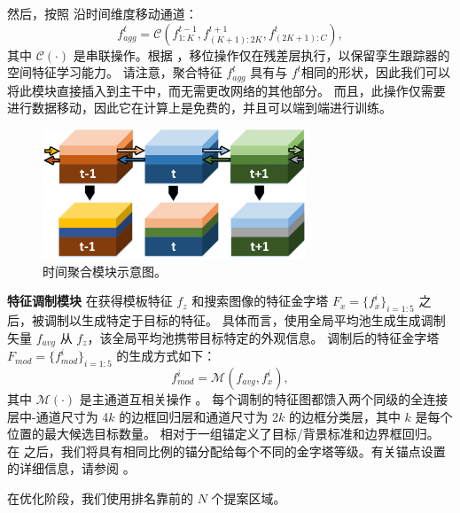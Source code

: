 然后，按照 \cite{lin2019tsm} 沿时间维度移动通道：
\begin{equation}
    f_{agg}^t = \mathcal{C}(f_{{1:K}}^{t-1}, f_{(K+1):2K}^{t+1}, f_{(2K+1):C}^{t}),
\end{equation}
其中 $\mathcal{C}(\cdot)$ 是串联操作。根据 \cite{lin2019tsm}，移位操作仅在残差层执行，以保留孪生跟踪器的空间特征学习能力。
请注意，聚合特征 $f_{agg}^t$ 具有与 $f^t$相同的形状，因此我们可以将此模块直接插入到主干中，而无需更改网络的其他部分。
而且，此操作仅需要进行数据移动，因此它在计算上是免费的，并且可以端到端进行训练。

\begin{figure}[t]
    \centering
    \includegraphics[width=0.7\textwidth]{Img/end/TSM_v1.pdf}
    \caption{时间聚合模块示意图。}
    \label{fig:TSM}
\end{figure}

\textbf{特征调制模块} 在获得模板特征 $f_{z}$ 和搜索图像的特征金字塔 $F_{x} = \{f_{x}^i\}_{i=1:5}$ 之后，被调制以生成特定于目标的特征。
具体而言，使用全局平均池生成生成调制矢量 $f_{avg}$ 从 $f_{z}$，该全局平均池携带目标特定的外观信息。
调制后的特征金字塔 $F_{mod} = \{f_{mod}^i\}_{i=1:5}$ 的生成方式如下：
\begin{equation}
    f_{mod}^i = \mathcal{M}(f_{avg}, f^i_x),
\end{equation}
其中 $\mathcal M(\cdot)$ 是主通道互相关操作 \cite{SiamRPN++}。
每个调制的特征图都馈入两个同级的全连接层中-通道尺寸为 4$k$ 的边框回归层和通道尺寸为 2$k$ 的边框分类层，其中 $k$ 是每个位置的最大候选目标数量。
相对于一组锚定义了目标/背景标准和边界框回归。
在 \cite{lin2017feature} 之后，我们将具有相同比例的锚分配给每个不同的金字塔等级。有关锚点设置的详细信息，请参阅 \cite{lin2017feature}。

在优化阶段，我们使用排名靠前的 $N$ 个提案区域。

